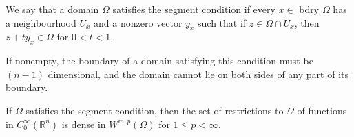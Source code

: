 \begin{para}
  We say that a domain $\Omega$ satisfies the segment condition if every $x \in$ bdry $\Omega$ has a neighbourhood $U_x$ and a nonzero vector $y_x$ such that if $z \in \bar{\Omega} \cap U_x$, then $z+t y_x \in \Omega$ for $0<t<1$.

  If nonempty, the boundary of a domain satisfying this condition must be $(n-1)$ dimensional, and the domain cannot lie on both sides of any part of its boundary.
\end{para}


\begin{theorem}
  If $\Omega$ satisfies the segment condition, then the set of restrictions to $\Omega$ of functions in $C_0^{\infty}\left(\mathbb{R}^n\right)$ is dense in $W^{m, p}(\Omega)$ for $1 \leq p<\infty$.
\end{theorem}

